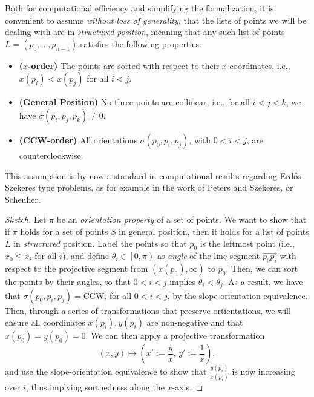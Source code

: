 Both for computational efficiency and simplifying the formalization, it is convenient to assume \emph{without loss of generality}, that the lists of points we will be dealing with are in \emph{structured position}, meaning that any such list of points $L = (p_0,\ldots, p_{n-1})$ satisfies the following properties:
\begin{itemize}
    \item \textbf{($x$-order)} The points are sorted with respect to their $x$-coordinates, i.e., $x(p_i) < x(p_j)$ for all $i < j$.
    \item \textbf{(General Position)} No three points are collinear, i.e., for all $i < j < k$, we have $\sigma(p_i, p_j, p_k) \neq 0$. 
    \item \textbf{(CCW-order)} All orientations $\sigma(p_0, p_i, p_j)$, with $0 < i < j$, are counterclockwise.
\end{itemize}
    This assumption is by now a standard in computational results regarding Erd\H{o}s-Szekeres type problems, as for example in the work of Peters and Szekeres, or Scheuher.

\begin{proof}[Sketch]
Let $\pi$ be an \emph{orientation property} of a set of points. We want to show that if $\pi$ holds for a set of points $S$ in general position, then it holds for a list of points $L$ in \emph{structured} position.    
Label the points so that $p_0$ is the leftmost point (i.e., $x_0 \leq x_i$ for all $i$), and define $\theta_i \in \left[0, \pi\right)$ as \emph{angle} of the line segment $\vec{p_0p_i}$ with respect to the projective segment from $(x(p_0), \infty)$ to $p_0$. 
Then, we can sort the points by their angles, so that $0 < i < j$ implies $\theta_i < \theta_j$.
As a result, we have that $\sigma(p_0, p_i, p_j) = \text{CCW}$, for all $0 < i < j$, by the slope-orientation equivalence. Then, through a series of transformations that preserve ortientations, we will ensure all coordinates $x(p_i), y(p_i)$ are non-negative and that $x(p_0) = y(p_0) = 0$. We can then apply a projective transformation 
\[
    (x, y) \mapsto \left(x' := \frac{y}{x}, \, y' := \frac{1}{x}\right),   
\]
and use the slope-orientation equivalence to show that  $\frac{y(p_i)}{x(p_i)}$ is now increasing over $i$, thus implying sortnedness along the $x$-axis. 

\end{proof}


